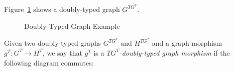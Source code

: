\begin{example} Figure~\ref{fig:process:doubly-typed-graph} shows a doubly-typed graph $G^{TG^T}$.

\begin{figure}[!ht]
  \centering
  \caption{Doubly-Typed Graph Example}\label{fig:process:doubly-typed-graph}
\end{figure}

\end{example}

\begin{definition}
  Given two doubly-typed graphs $G^{TG^T}$ and $H^{TG^T}$ and a graph morphism $g^T : G^T \rightarrow H^T$, we say that $g^T$ is a \emph{$TG^T$-doubly-typed graph morphism} if the following diagram commutes:

\end{definition}

